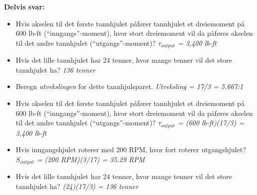 





\noindent
{\bf Delvis svar:}

\begin{itemize}
\item{} Hvis akselen til det første tannhjulet påfører tannhjulet et dreiemoment på 600 lb-ft (``inngangs''-moment), hvor stort dreiemoment vil da påføres akselen til det andre tannhjulet (``utgangs''-moment)?  {\it $\tau_{output}$ = 3,400 lb-ft}
\vskip 10pt
\item{} Hvis det lille tannhjulet har 24 tenner, hvor mange tenner vil det store tannhjulet ha?  {\it 136 tenner}
\end{itemize}
 






\begin{itemize}
\item{} Beregn {\it utvekslingen} for dette tannhjulsparet.  {\it Utveksling = 17/3 = 5.667:1}
\vskip 10pt
\item{} Hvis akselen til det første tannhjulet påfører tannhjulet et dreiemoment på 600 lb-ft (``inngangs''-moment), hvor stort dreiemoment vil da påføres akselen til det andre tannhjulet (``utgangs''-moment)?  {\it $\tau_{output}$ = (600 lb-ft)(17/3) = 3,400 lb-ft}
\vskip 10pt
\item{} Hvis inngangshjulet roterer med 200 RPM, hvor fort roterer utgangshjulet?  {\it $S_{output}$ = (200 RPM)(3/17) = 35.29 RPM}
\vskip 10pt
\item{} Hvis det lille tannhjulet har 24 tenner, hvor mange tenner vil det store tannhjulet ha?  {\it (24)(17/3) = 136 tenner}
\end{itemize}



